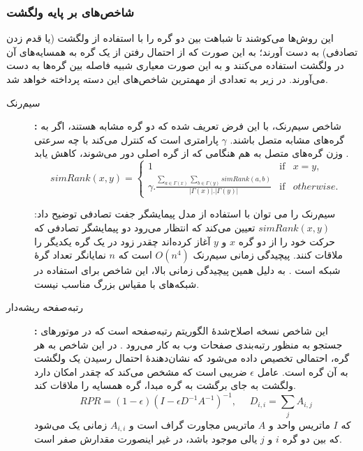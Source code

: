 \subsubsection{شاخص‌های بر پایه ولگشت}
این روش‌ها می‌کوشند تا شباهت بین دو گره را با استفاده از ولگشت (یا قدم زدن تصادفی) به دست آورند؛ به این صورت که از احتمال رفتن از یک گره به همسایه‌های آن در ولگشت استفاده می‌کنند و به این صورت معیاری شبیه فاصله بین گره‌ها به دست می‌آورند. در زیر به تعدادی از مهمترین شاخص‌های این دسته پرداخته خواهد شد.
\begin{description}
\item[سیم‌رنک]\textbf{:}
شاخص سیم‌رنک، با این فرض تعریف شده که دو گره مشابه هستند، اگر به گره‌های مشابه متصل باشند. $\gamma$  پارامتری است که کنترل می‌کند با چه سرعتی وزن گره‌های متصل به هم هنگامی که از گره اصلی  دور می‌شوند، کاهش یابد \cite{mcpherson2001birds}. %
\begin{equation}
  simRank(x, y)=  \left\{
              \begin{array}{lcl}
                1 & \text{if} &  x = y ,\\
                \gamma . \frac{\sum_{a\in \varGamma(x)} \sum_{b\in \varGamma(y)}simRank(a,b)}{|\varGamma(x)|.|\varGamma(y)|} & \text{if} & otherwise.
              \end{array} \right.
\end{equation}

سیم‌رنک را می توان با استفاده از مدل پیمایشگر جفت تصادفی توضیح داد: $simRank(x, y)$ تعیین می‌کند که انتظار می‌رود دو پیمایشگر تصادفی که حرکت خود را از دو گره $x$ و $y$  آغاز کرده‌اند چقدر زود در یک گره یکدیگر را ملاقات کنند.
پیچیدگی زمانی سیم‌رنک $O(n^4)$ است که $n$ نمایانگر تعداد گرهٔ شبکه است \cite{jeh2002simrank}. به دلیل همین پیچیدگی زمانی بالا، این شاخص برای استفاده در شبکه‌های با مقیاس بزرگ مناسب نیست. 

\item[رتبه‌صفحه ریشه‌دار]\textbf{:}
این شاخص نسخه اصلاح‌شدهٔ الگوریتم رتبه‌صفحه است که در موتورهای جستجو به منظور رتبه‌بندی صفحات وب به کار می‌رود \cite{liben2007link}. در این شاخص به هر گره، احتمالی تخصیص داده می‌شود که نشان‌دهندهٔ احتمال رسیدن یک ولگشت به آن گره است. عامل $\epsilon $ ضریبی است که مشخص می‌کند که چقدر امکان دارد ولگشت به جای برگشت به گره مبدا، گره همسایه را ملاقات کند.
 \begin{equation}
RPR = (1-\epsilon)(I-\epsilon D^{-1} A^{-1})^{-1},\ \ \ \ \ \ D_{i,i} =  \sum_{j} A_{i,j}
\end{equation}
که $I$ ماتریس واحد و $A$ ماتریس مجاورت گراف است و $A_{i,i}$ زمانی یک می‌شود که بین دو گره $i$ و $j$ یالی موجود باشد، در غیر اینصورت مقدارش صفر است.


\end{description}
